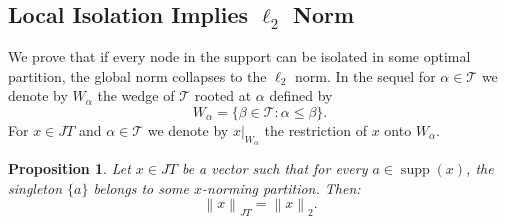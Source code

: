 \documentclass[11pt,a4paper]{amsart}
\newtheorem{proposition}[theorem]{Proposition}
\newcommand{\JT}{JT}
\newcommand{\Tree}{\mathcal{T}}
\newcommand{\norm}[1]{\left\lVert#1\right\rVert}
\newcommand{\supp}{\operatorname{supp}}
\begin{document}
\subsection{Local Isolation Implies $\ell_2$ Norm}

We prove that if every node in the support can be isolated in some optimal partition, the global norm collapses to the $\ell_2$ norm. In the sequel for $\alpha \in \Tree $ we denote by $W_{\alpha}$ the wedge of $\Tree$ rooted at $\alpha$ defined by \[ W_\alpha = \{ \beta \in \Tree: \alpha \le \beta \}. \]
For $ x\in \JT$  and $\alpha \in \Tree$ we  denote by $ x|_{W_\alpha}$ the restriction of $x$ onto 
$W_\alpha $.

\begin{proposition}
    Let $x \in \JT$ be a vector such that for every $a \in \supp(x)$, the singleton $\{a\}$ belongs to some $x$-norming partition. Then:
    \[ \norm{x}_{\JT} = \norm{x}_2. \]
\end{proposition}
\end{document}
